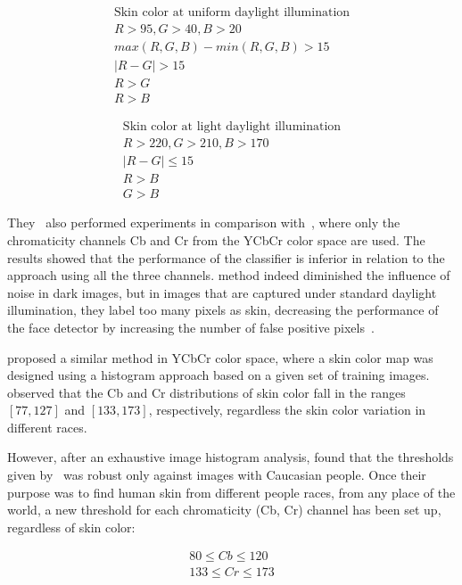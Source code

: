 \begin{align*}
\text{Skin color at uniform daylight illumination}\\
R > 95, G > 40, B > 20 \\
max(R, G, B) - min(R, G, B) > 15 \\
|R - G| > 15 \\
R > G \\
R > B
\end{align*}

\begin{align*}
\text{Skin color at light daylight illumination}\\
R > 220, G > 210, B > 170 \\
|R - G| \leq 15 \\
R > B \\
G > B
\end{align*}

They~\citep{kovac:03} also performed experiments in comparison with~\citet{hsu:02}, where only the chromaticity channels Cb and Cr from the YCbCr color space are used. The results showed that the performance of the classifier is inferior in relation to the approach using all the three channels. \citet{hsu:02} method indeed diminished the influence of noise in dark images, but in images that are captured under standard daylight illumination, they label too many pixels as skin, decreasing the performance of the face detector by increasing the number of false positive pixels~\citep{kovac:03}.

\citet{chai:99} proposed a similar method in YCbCr color space, where a skin color map was designed using a histogram approach based on a given set of training images. \citet{chai:99} observed that the Cb and Cr distributions of skin color fall in the ranges $[77, 127]$ and $[133, 173]$, respectively, regardless the skin color variation in different races.

However, after an exhaustive image histogram analysis, \citet{basilio:11} found that the thresholds given by~\citet{chai:99} was robust only against images with Caucasian people. Once their~\citep{basilio:11} purpose was to find human skin from different people races, from any place of the world, a new threshold for each chromaticity (Cb, Cr) channel has been set up, regardless of skin  color:

\begin{align*}
80  \leq Cb \leq 120 \\
133 \leq Cr \leq 173
\end{align*}

